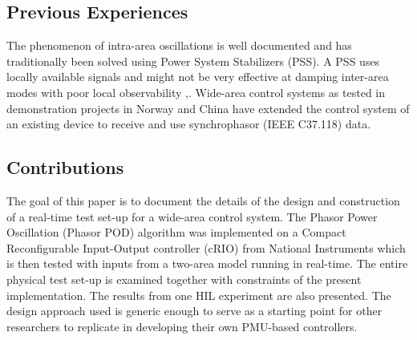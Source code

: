 \documentclass[conference]{IEEEtran}
\begin{document}
\subsection{Previous Experiences}
The phenomenon of intra-area oscillations is well documented and has traditionally been solved using Power System Stabilizers (PSS). A PSS uses locally available signals and might not be very effective at damping inter-area modes with poor local observability \cite{Yuwa},\cite{localREMcomparison}. Wide-area control systems as tested in demonstration projects in Norway \cite{WAPODNorway} and China \cite{WAPODChina} have extended the control system of an existing device to receive and use synchrophasor (IEEE C37.118) data.
\subsection{Contributions}
The goal of this paper is to document the details of the design and construction of a real-time test set-up for a wide-area control system. The Phasor Power Oscillation (Phasor POD) algorithm \cite{PhasorPOD} was implemented on a Compact Reconfigurable Input-Output controller (cRIO) \cite{cRIO9081} from National Instruments which is then tested with inputs from a two-area model\cite{KundurTwoArea} running in real-time. The entire physical test set-up is examined together with constraints of the present implementation. The results from one HIL experiment are also presented. The design approach used is generic enough to serve as a starting point for other researchers to replicate in developing their own PMU-based controllers.
\end{document}
